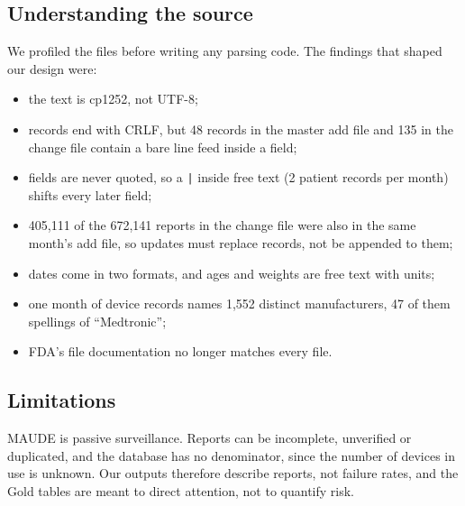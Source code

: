 \subsection{Understanding the source}

We profiled the files before writing any parsing code. The findings that shaped our design were:
\begin{itemize}
  \item the text is cp1252, not UTF-8;
  \item records end with CRLF, but 48 records in the master add file and 135 in the change file
        contain a bare line feed inside a field;
  \item fields are never quoted, so a \texttt{|} inside free text (2 patient records per month)
        shifts every later field;
  \item 405{,}111 of the 672{,}141 reports in the change file were also in the same month's add
        file, so updates must replace records, not be appended to them;
  \item dates come in two formats, and ages and weights are free text with units;
  \item one month of device records names 1{,}552 distinct manufacturers, 47 of them spellings
        of ``Medtronic'';
  \item FDA's file documentation no longer matches every file.
\end{itemize}

\subsection{Limitations}

MAUDE is passive surveillance. Reports can be incomplete, unverified or duplicated, and the
database has no denominator, since the number of devices in use is unknown. Our outputs
therefore describe reports, not failure rates, and the Gold tables are meant to direct
attention, not to quantify risk.
